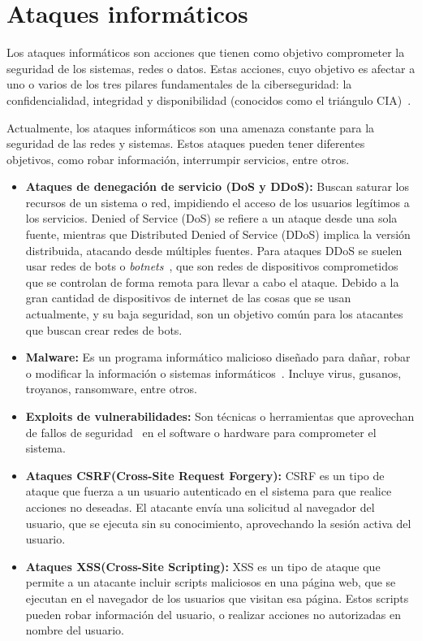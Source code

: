 \section{Ataques informáticos}
Los ataques informáticos son acciones que tienen como objetivo comprometer la seguridad de los sistemas, redes o datos.
Estas acciones, cuyo objetivo es afectar a uno o varios de los tres pilares fundamentales de la ciberseguridad: la confidencialidad, integridad y disponibilidad (conocidos como el triángulo CIA)~\cite{NicholasEdwards2020, Chaeikar2012}.

Actualmente, los ataques informáticos son una amenaza constante para la seguridad de las redes y sistemas. Estos ataques pueden tener diferentes objetivos, como robar información, interrumpir servicios, entre otros.

\begin{itemize}
    \item \textbf{Ataques de denegación de servicio (DoS y DDoS):} Buscan saturar los recursos de un sistema o red, impidiendo el acceso de los usuarios legítimos a los servicios. Denied of Service (DoS) se refiere a un ataque desde una sola fuente, mientras que Distributed Denied of Service (DDoS) implica la versión distribuida, atacando desde múltiples fuentes. Para ataques DDoS se suelen usar redes de bots o \textit{botnets}~\cite{kolias2017}, que son redes de dispositivos comprometidos que se controlan de forma remota para llevar a cabo el ataque. Debido a la gran cantidad de dispositivos de internet de las cosas que se usan actualmente, y su baja seguridad, son un objetivo común para los atacantes que buscan crear redes de bots. 

    \item \textbf{Malware:} Es un programa informático malicioso diseñado para dañar, robar o modificar la información o sistemas informáticos~\cite{SushilJajodia2025}. Incluye virus, gusanos, troyanos, ransomware, entre otros. 

    \item \textbf{Exploits de vulnerabilidades:} Son técnicas o herramientas que aprovechan de fallos de seguridad~\cite{SushilJajodia2025} en el software o hardware para comprometer el sistema. 

	\item \textbf{Ataques CSRF(Cross-Site Request Forgery):} CSRF es un tipo de ataque que fuerza a un usuario autenticado en el sistema para que realice acciones no deseadas. El atacante envía una solicitud al navegador del usuario, que se ejecuta sin su conocimiento, aprovechando la sesión activa del usuario.

	\item \textbf{Ataques XSS(Cross-Site Scripting):} XSS es un tipo de ataque que permite a un atacante incluir scripts maliciosos en una página web, que se ejecutan en el navegador de los usuarios que visitan esa página. Estos scripts pueden robar información del usuario, o realizar acciones no autorizadas en nombre del usuario.
\end{itemize}

